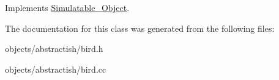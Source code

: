 Implements \hyperlink{classSimulatable__Object_abe7c02fe250ef5be42011890d8a7b37b}{Simulatable\+\_\+\+Object}.



The documentation for this class was generated from the following files\+:\begin{DoxyCompactItemize}
\item 
objects/abstractish/bird.\+h\item 
objects/abstractish/bird.\+cc\end{DoxyCompactItemize}
